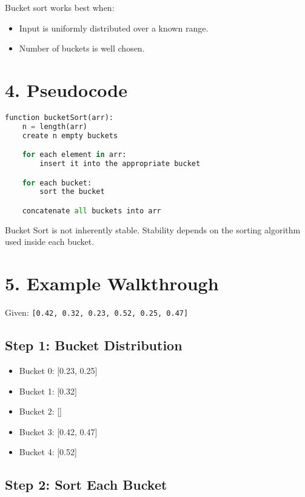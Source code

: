 \documentclass[14pt]{extarticle}
\begin{document}
Bucket sort works best when:
\begin{itemize}
    \item Input is uniformly distributed over a known range.
    \item Number of buckets is well chosen.
\end{itemize}

\section*{4. Pseudocode}

\begin{lstlisting}[language=Python]
function bucketSort(arr):
    n = length(arr)
    create n empty buckets

    for each element in arr:
        insert it into the appropriate bucket

    for each bucket:
        sort the bucket

    concatenate all buckets into arr
\end{lstlisting}

\begin{tcolorbox}[
  colback=white,
  colframe=black,
  title=Stability Note
]
Bucket Sort is not inherently stable. Stability depends on the sorting algorithm used inside each bucket.
\end{tcolorbox}

\section*{5. Example Walkthrough}

Given: \texttt{[0.42, 0.32, 0.23, 0.52, 0.25, 0.47]}

\subsection*{Step 1: Bucket Distribution}

\begin{itemize}
    \item Bucket 0: [0.23, 0.25]
    \item Bucket 1: [0.32]
    \item Bucket 2: []
    \item Bucket 3: [0.42, 0.47]
    \item Bucket 4: [0.52]
\end{itemize}

\subsection*{Step 2: Sort Each Bucket}
\end{document}

